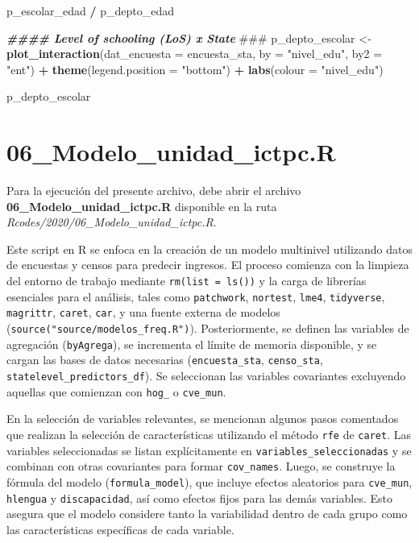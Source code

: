 \documentclass[
  12pt,
]{book}
\newenvironment{Shaded}{\begin{snugshade}}{\end{snugshade}}
\newcommand{\AlertTok}[1]{\textcolor[rgb]{0.94,0.16,0.16}{#1}}
\newcommand{\AttributeTok}[1]{\textcolor[rgb]{0.13,0.29,0.53}{#1}}
\newcommand{\DocumentationTok}[1]{\textcolor[rgb]{0.56,0.35,0.01}{\textbf{\textit{#1}}}}
\newcommand{\FunctionTok}[1]{\textcolor[rgb]{0.13,0.29,0.53}{\textbf{#1}}}
\newcommand{\NormalTok}[1]{#1}
\newcommand{\OtherTok}[1]{\textcolor[rgb]{0.56,0.35,0.01}{#1}}
\newcommand{\SpecialCharTok}[1]{\textcolor[rgb]{0.81,0.36,0.00}{\textbf{#1}}}
\newcommand{\StringTok}[1]{\textcolor[rgb]{0.31,0.60,0.02}{#1}}
\begin{document}
\begin{Shaded}
\begin{Highlighting}[]
\NormalTok{p\_escolar\_edad }\SpecialCharTok{/}\NormalTok{ p\_depto\_edad}

\DocumentationTok{\#\#\#\# Level of schooling (LoS) x State }\AlertTok{\#\#\#}
\NormalTok{p\_depto\_escolar }\OtherTok{\textless{}{-}}
  \FunctionTok{plot\_interaction}\NormalTok{(}\AttributeTok{dat\_encuesta =}\NormalTok{ encuesta\_sta,}
                   \AttributeTok{by =} \StringTok{"nivel\_edu"}\NormalTok{,}
                   \AttributeTok{by2 =} \StringTok{"ent"}\NormalTok{) }\SpecialCharTok{+}
  \FunctionTok{theme}\NormalTok{(}\AttributeTok{legend.position =} \StringTok{"bottom"}\NormalTok{) }\SpecialCharTok{+} \FunctionTok{labs}\NormalTok{(}\AttributeTok{colour =} \StringTok{"nivel\_edu"}\NormalTok{)}

\NormalTok{p\_depto\_escolar}
\end{Highlighting}
\end{Shaded}

\hypertarget{modelo_unidad_ictpc.r}{%
\chapter*{06\_Modelo\_unidad\_ictpc.R}\label{modelo_unidad_ictpc.r}}

Para la ejecución del presente archivo, debe abrir el archivo \textbf{06\_Modelo\_unidad\_ictpc.R} disponible en la ruta \emph{Rcodes/2020/06\_Modelo\_unidad\_ictpc.R}.

Este script en R se enfoca en la creación de un modelo multinivel utilizando datos de encuestas y censos para predecir ingresos. El proceso comienza con la limpieza del entorno de trabajo mediante \texttt{rm(list\ =\ ls())} y la carga de librerías esenciales para el análisis, tales como \texttt{patchwork}, \texttt{nortest}, \texttt{lme4}, \texttt{tidyverse}, \texttt{magrittr}, \texttt{caret}, \texttt{car}, y una fuente externa de modelos (\texttt{source("source/modelos\_freq.R")}). Posteriormente, se definen las variables de agregación (\texttt{byAgrega}), se incrementa el límite de memoria disponible, y se cargan las bases de datos necesarias (\texttt{encuesta\_sta}, \texttt{censo\_sta}, \texttt{statelevel\_predictors\_df}). Se seleccionan las variables covariantes excluyendo aquellas que comienzan con \texttt{hog\_} o \texttt{cve\_mun}.

En la selección de variables relevantes, se mencionan algunos pasos comentados que realizan la selección de características utilizando el método \texttt{rfe} de \texttt{caret}. Las variables seleccionadas se listan explícitamente en \texttt{variables\_seleccionadas} y se combinan con otras covariantes para formar \texttt{cov\_names}. Luego, se construye la fórmula del modelo (\texttt{formula\_model}), que incluye efectos aleatorios para \texttt{cve\_mun}, \texttt{hlengua} y \texttt{discapacidad}, así como efectos fijos para las demás variables. Esto asegura que el modelo considere tanto la variabilidad dentro de cada grupo como las características específicas de cada variable.
\end{document}

